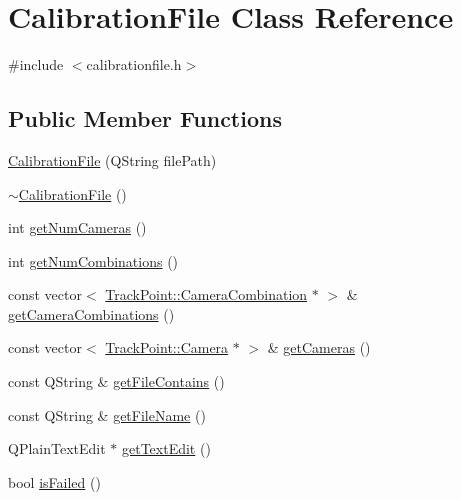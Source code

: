 \hypertarget{class_calibration_file}{}\section{Calibration\+File Class Reference}
\label{class_calibration_file}


{\ttfamily \#include $<$calibrationfile.\+h$>$}

\subsection*{Public Member Functions}
\begin{DoxyCompactItemize}
\item 
\mbox{\hyperlink{class_calibration_file_a349ad2ceece7060f0c98dd4f9a95fd5a}{Calibration\+File}} (Q\+String file\+Path)
\item 
\mbox{\hyperlink{class_calibration_file_a136f431f543f20bf2b015c85ad7d0017}{$\sim$\+Calibration\+File}} ()
\item 
int \mbox{\hyperlink{class_calibration_file_ad5a0e31f58137b5742093686f41c945a}{get\+Num\+Cameras}} ()
\item 
int \mbox{\hyperlink{class_calibration_file_ab710e524319fd492a8a136ba5b9666db}{get\+Num\+Combinations}} ()
\item 
const vector$<$ \mbox{\hyperlink{struct_track_point_1_1_camera_combination}{Track\+Point\+::\+Camera\+Combination}} $\ast$ $>$ \& \mbox{\hyperlink{class_calibration_file_a061c91faf45b5d26d920e789b6208867}{get\+Camera\+Combinations}} ()
\item 
const vector$<$ \mbox{\hyperlink{struct_track_point_1_1_camera}{Track\+Point\+::\+Camera}} $\ast$ $>$ \& \mbox{\hyperlink{class_calibration_file_a58b7c9c270a2fe4148c61e2127194e8c}{get\+Cameras}} ()
\item 
const Q\+String \& \mbox{\hyperlink{class_calibration_file_a2b079fb7799837ff11c24f7463dc69b8}{get\+File\+Contains}} ()
\item 
const Q\+String \& \mbox{\hyperlink{class_calibration_file_a38a25f3a13cb12e0347a8dca5ab52e47}{get\+File\+Name}} ()
\item 
Q\+Plain\+Text\+Edit $\ast$ \mbox{\hyperlink{class_calibration_file_aa49c09c9493c85e00cebc47da8f56789}{get\+Text\+Edit}} ()
\item 
bool \mbox{\hyperlink{class_calibration_file_a68687a65fa7be1763c6f22ed6142faad}{is\+Failed}} ()
\end{DoxyCompactItemize}


